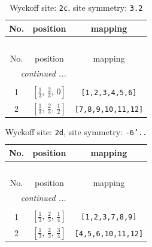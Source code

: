 \documentclass[fleqn,8pt]{jsarticle}
\begin{document}
\renewcommand{\arraystretch}{1.2}
\begin{longtable}{ccc}
\caption{Wyckoff site: {\tt 2c}, site symmetry: {\tt 3.2}}
 \\
 \hline \hline
No. & position & mapping \\ \hline \endfirsthead

\multicolumn{2}{l}{\tablename\ \thetable{}} \\
 \hline \hline
No. & position & mapping \\ \hline \endhead

 \hline \hline
\multicolumn{2}{r}{\footnotesize\it continued ...} \\ \endfoot

 \hline \hline
\multicolumn{2}{r}{} \\ \endlastfoot

1 & $\left[ \frac{1}{3},\, \frac{2}{3},\, 0 \right]$ & {\tt [1,2,3,4,5,6]} \\ \hline
2 & $\left[ \frac{1}{3},\, \frac{2}{3},\, \frac{1}{2} \right]$ & {\tt [7,8,9,10,11,12]} \\
\end{longtable}
\renewcommand{\arraystretch}{1.2}
\begin{longtable}{ccc}
\caption{Wyckoff site: {\tt 2d}, site symmetry: {\tt -6'..}}
 \\
 \hline \hline
No. & position & mapping \\ \hline \endfirsthead

\multicolumn{2}{l}{\tablename\ \thetable{}} \\
 \hline \hline
No. & position & mapping \\ \hline \endhead

 \hline \hline
\multicolumn{2}{r}{\footnotesize\it continued ...} \\ \endfoot

 \hline \hline
\multicolumn{2}{r}{} \\ \endlastfoot

1 & $\left[ \frac{1}{3},\, \frac{2}{3},\, \frac{1}{4} \right]$ & {\tt [1,2,3,7,8,9]} \\ \hline
2 & $\left[ \frac{1}{3},\, \frac{2}{3},\, \frac{3}{4} \right]$ & {\tt [4,5,6,10,11,12]} \\
\end{longtable}
\renewcommand{\arraystretch}{1.2}
\end{document}
